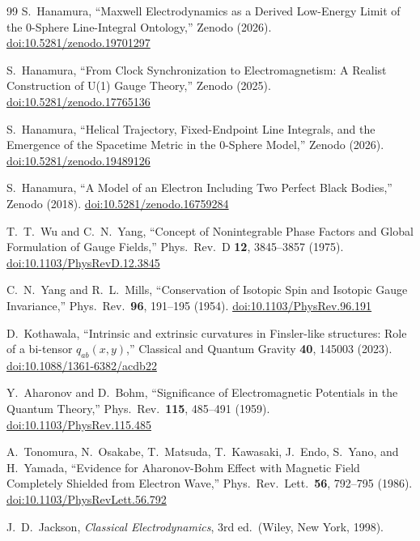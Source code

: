 \documentclass[%
 reprint, amsmath,amssymb, aps, prb, ]{revtex4-2}
\numberwithin{equation}{section}
\begin{document}
\begin{thebibliography}{99}
S.~Hanamura, ``Maxwell Electrodynamics as a Derived Low-Energy Limit of the 0-Sphere Line-Integral Ontology,'' Zenodo (2026). \href{https://doi.org/10.5281/zenodo.19701297}{doi:10.5281/zenodo.19701297}

S.~Hanamura, ``From Clock Synchronization to Electromagnetism: A Realist Construction of U(1) Gauge Theory,'' Zenodo (2025). \href{https://doi.org/10.5281/zenodo.17765136}{doi:10.5281/zenodo.17765136}

S.~Hanamura, ``Helical Trajectory, Fixed-Endpoint Line Integrals, and the Emergence of the Spacetime Metric in the 0-Sphere Model,'' Zenodo (2026). \href{https://doi.org/10.5281/zenodo.19489126}{doi:10.5281/zenodo.19489126}

S.~Hanamura, ``A Model of an Electron Including Two Perfect Black Bodies,'' Zenodo (2018). \href{https://doi.org/10.5281/zenodo.16759284}{doi:10.5281/zenodo.16759284}

T.~T.~Wu and C.~N.~Yang, ``Concept of Nonintegrable Phase Factors and Global Formulation of Gauge Fields,'' Phys.\ Rev.\ D \textbf{12}, 3845--3857 (1975). \href{https://doi.org/10.1103/PhysRevD.12.3845}{doi:10.1103/PhysRevD.12.3845}

C.~N.~Yang and R.~L.~Mills, ``Conservation of Isotopic Spin and Isotopic Gauge Invariance,'' Phys.\ Rev.\ \textbf{96}, 191--195 (1954). \href{https://doi.org/10.1103/PhysRev.96.191}{doi:10.1103/PhysRev.96.191}

D.~Kothawala, ``Intrinsic and extrinsic curvatures in Finsler-like structures: Role of a bi-tensor $q_{ab}(x,y)$,'' Classical and Quantum Gravity \textbf{40}, 145003 (2023). \href{https://doi.org/10.1088/1361-6382/acdb22}{doi:10.1088/1361-6382/acdb22}

Y.~Aharonov and D.~Bohm, ``Significance of Electromagnetic Potentials in the Quantum Theory,'' Phys.\ Rev.\ \textbf{115}, 485--491 (1959). \href{https://doi.org/10.1103/PhysRev.115.485}{doi:10.1103/PhysRev.115.485}

A.~Tonomura, N.~Osakabe, T.~Matsuda, T.~Kawasaki, J.~Endo, S.~Yano, and H.~Yamada, ``Evidence for Aharonov-Bohm Effect with Magnetic Field Completely Shielded from Electron Wave,'' Phys.\ Rev.\ Lett.\ \textbf{56}, 792--795 (1986). \href{https://doi.org/10.1103/PhysRevLett.56.792}{doi:10.1103/PhysRevLett.56.792}

J.~D.~Jackson, \textit{Classical Electrodynamics}, 3rd ed.\ (Wiley, New York, 1998).


\end{thebibliography}
\end{document}
